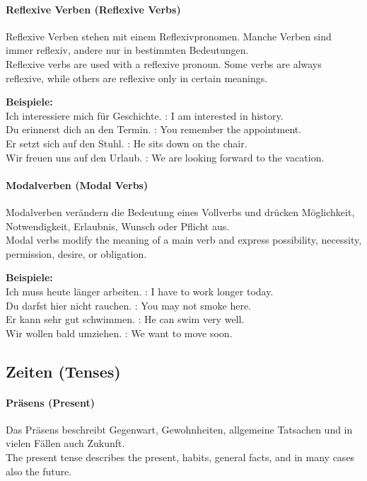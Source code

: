 \documentclass[a4paper]{article}
\begin{document}
            \paragraph{Reflexive Verben {\small (Reflexive Verbs)}}
                Reflexive Verben stehen mit einem Reflexivpronomen. Manche Verben sind immer reflexiv, andere nur in bestimmten Bedeutungen.\\
                Reflexive verbs are used with a reflexive pronoun. Some verbs are always reflexive, while others are reflexive only in certain meanings.
                
                \textbf{Beispiele:}\\
                Ich interessiere mich für Geschichte. : I am interested in history.\\
                Du erinnerst dich an den Termin. : You remember the appointment.\\
                Er setzt sich auf den Stuhl. : He sits down on the chair.\\
                Wir freuen uns auf den Urlaub. : We are looking forward to the vacation.
            
            \paragraph{Modalverben {\small (Modal Verbs)}}
                Modalverben verändern die Bedeutung eines Vollverbs und drücken Möglichkeit, Notwendigkeit, Erlaubnis, Wunsch oder Pflicht aus.\\
                Modal verbs modify the meaning of a main verb and express possibility, necessity, permission, desire, or obligation.
                
                \textbf{Beispiele:}\\
                Ich muss heute länger arbeiten. : I have to work longer today.\\
                Du darfst hier nicht rauchen. : You may not smoke here.\\
                Er kann sehr gut schwimmen. : He can swim very well.\\
                Wir wollen bald umziehen. : We want to move soon.
    
    \subsection{Zeiten {\small (Tenses)}}
        
        \paragraph{Präsens {\small (Present)}}
            Das Präsens beschreibt Gegenwart, Gewohnheiten, allgemeine Tatsachen und in vielen Fällen auch Zukunft.\\
            The present tense describes the present, habits, general facts, and in many cases also the future.
            
\end{document}
